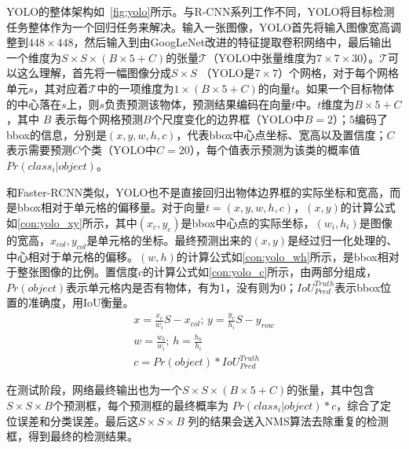 

YOLO的整体架构如\figurename \, \ref{fig:yolo}所示。与R-CNN系列工作不同，YOLO将目标检测任务整体作为一个回归任务来解决。输入一张图像，YOLO首先将输入图像宽高调整到$448 \times 448$，然后输入到由GoogLeNet\cite{7298594,7780677}改进的特征提取卷积网络中，最后输出一个维度为$S \times S \times (B \times 5 + C)$的张量$\mathcal{T}$（YOLO中张量维度为$7 \times 7 \times 30$）。$\mathcal{T}$可以这么理解，首先将一幅图像分成$S \times S$ （YOLO是$7\times 7$）个网格，对于每个网格单元$s$，其对应着$\mathcal{T}$中的一项维度为$1 \times (B \times 5 + C)$的向量$t$。如果一个目标物体的中心落在$s$上，则$s$负责预测该物体，预测结果编码在向量$t$中。$t$维度为$B \times 5 + C$，其中 $B$ 表示每个网格预测$B$个尺度变化的边界框（YOLO中$B=2$）；$5$编码了bbox的信息，分别是$(x,y,w,h,c)$，代表bbox中心点坐标、宽高以及置信度；$C$ 表示需要预测$C$个类（YOLO中$C=20$），每个值表示预测为该类的概率值$Pr(class_i|object)$。

和Faster-RCNN类似，YOLO也不是直接回归出物体边界框的实际坐标和宽高，而是bbox相对于单元格的偏移量。对于向量$t=(x,y,w,h,c)$，$(x,y)$的计算公式如\ref{con:yolo_xy}所示，其中$(x_c,y_c)$是bbox中心点的实际坐标，$(w_i, h_i)$是图像的宽高，$x_{col}, y_{col}$是单元格的坐标。最终预测出来的$(x,y)$是经过归一化处理的、中心相对于单元格的偏移。$(w,h)$的计算公式如\ref{con:yolo_wh}所示，是bbox相对于整张图像的比例。置信度$c$的计算公式如\ref{con:yolo_c}所示，由两部分组成，$Pr(object)$表示单元格内是否有物体，有为1，没有则为0；$IoU^{Truth}_{Pred}$表示bbox位置的准确度，用IoU衡量。
\begin{gather}
x = \frac{x_c}{w_i}S - x_{col}; \, y = \frac{y_c}{h_i}S - y_{row} 
\label{con:yolo_xy}\\
w = \frac{w_b}{w_i}; \, h = \frac{h_b}{h_i}
\label{con:yolo_wh}\\
c = Pr(object)*IoU^{Truth}_{Pred}
\label{con:yolo_c}
\end{gather}

在测试阶段，网络最终输出也为一个$S \times S \times (B \times 5 + C)$的张量，其中包含$S \times S \times B$个预测框，每个预测框的最终概率为 $Pr(class_i|object)* c$，综合了定位误差和分类误差。最后这$S \times S \times B $ 列的结果会送入NMS算法去除重复的检测框，得到最终的检测结果。

